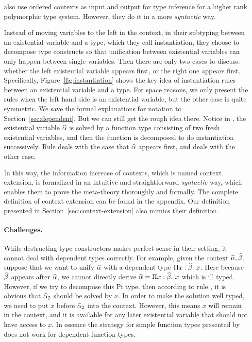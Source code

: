 \citet{dunfield2013complete} also use ordered contexts as input and output for
type inference for a higher rank polymorphic type system. However, they do it in
a more \textit{syntactic} way.

Instead of moving variables to the left in the context, in their subtyping
between an existential variable and a type, which they call instantiation, they
choose to decompose type constructs so that unification between existential
variables can only happen between single variables.
Then there are only two cases to discuss: whether the left
existential variable appears first, or the right one appears first.
Specifically, Figure~\ref{fig:instantiation} shows the key idea of instantiation
rules between an existential variable and a type. For space reasons, we only
present the rules when the left hand side is an existential variable, but the
other case is quite symmetric. We save the formal explanations for notation
to Section~\ref{sec:dependent}. But we can still get the rough idea
there. Notice in , the existential variable $\widehat{\alpha}$ is solved by a
function type consisting of two fresh existential variables, and then the
function is decomposed to do instantiation successively. Rule 
deals with the case that $\widehat{\alpha}$ appears first, and  deals with the
other case.

In this way, the information increase of contexts, which is named context
extension, is formalized in an intuitive and straightforward \textit{syntactic}
way, which enables them to prove the meta-theory thoroughly and formally.
The complete definition of context extension can be found in the
appendix. Our
definition presented in Section~\ref{sec:context-extension} also mimics their
definition.

\paragraph{Challenges.} While destructing type constructors makes perfect sense
in their setting, it cannot deal with dependent types correctly. For example,
given the context $\widehat{\alpha}, \widehat{\beta}$, suppose that we want to unify $\widehat{\alpha}$ with a
dependent type $\Pi x:\widehat{\beta}.~ x$. Here because $\widehat{\beta}$ appears after $\widehat{\alpha}$, we
cannot directly derive $\widehat{\alpha} = \Pi x:\widehat{\beta}.~ x$ which is ill typed. However, if
we try to decompose this Pi type, then according to rule , it is
obvious that $\widehat{\alpha}_2$ should be solved by $x$. In order to make the solution
well typed, we need to put $x$ before $\widehat{\alpha}_2$ into the context. However, this
means $x$ will remain in the context, and it is available for any later
existential variable that should not have access to $x$. In essence the strategy
for simple function types presented by ~\citet{dunfield2013complete} does not
work for dependent function types.

